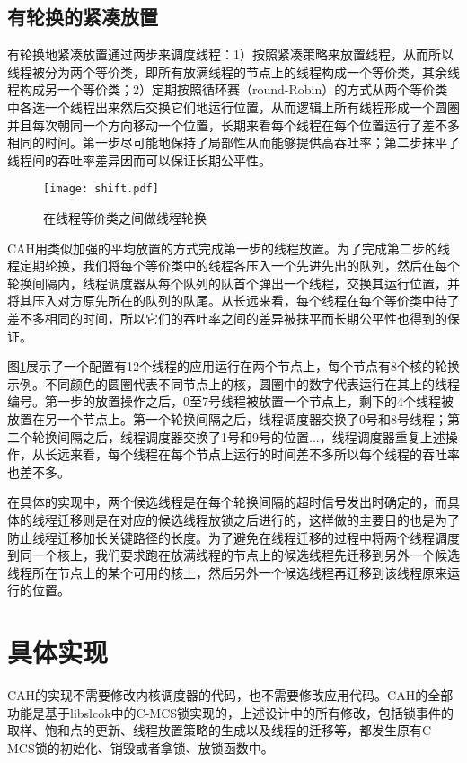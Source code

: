 \subsection{有轮换的紧凑放置}
有轮换地紧凑放置通过两步来调度线程：1）按照紧凑策略来放置线程，从而所以线程被分为两个等价类，即所有放满线程的节点上的线程构成一个等价类，其余线程构成另一个等价类；2）定期按照循环赛（round-Robin）的方式从两个等价类中各选一个线程出来然后交换它们地运行位置，从而逻辑上所有线程形成一个圆圈并且每次朝同一个方向移动一个位置，长期来看每个线程在每个位置运行了差不多相同的时间。第一步尽可能地保持了局部性从而能够提供高吞吐率；第二步抹平了线程间的吞吐率差异因而可以保证长期公平性。
\begin{figure}[t]
	\centering
	\texttt{[image: shift.pdf]}
	\caption{在线程等价类之间做线程轮换}
	\label{Fig:shift}
\end{figure}

CAH用类似加强的平均放置的方式完成第一步的线程放置。为了完成第二步的线程定期轮换，我们将每个等价类中的线程各压入一个先进先出的队列，然后在每个轮换间隔内，线程调度器从每个队列的队首个弹出一个线程，交换其运行位置，并将其压入对方原先所在的队列的队尾。从长远来看，每个线程在每个等价类中待了差不多相同的时间，所以它们的吞吐率之间的差异被抹平而长期公平性也得到的保证。

图\ref{Fig:shift}展示了一个配置有12个线程的应用运行在两个节点上，每个节点有8个核的轮换示例。不同颜色的圆圈代表不同节点上的核，圆圈中的数字代表运行在其上的线程编号。第一步的放置操作之后，0至7号线程被放置一个节点上，剩下的4个线程被放置在另一个节点上。第一个轮换间隔之后，线程调度器交换了0号和8号线程；第二个轮换间隔之后，线程调度器交换了1号和9号的位置...，线程调度器重复上述操作，从长远来看，每个线程在每个节点上运行的时间差不多所以每个线程的吞吐率也差不多。

在具体的实现中，两个候选线程是在每个轮换间隔的超时信号发出时确定的，而具体的线程迁移则是在对应的候选线程放锁之后进行的，这样做的主要目的也是为了防止线程迁移加长关键路径的长度。为了避免在线程迁移的过程中将两个线程调度到同一个核上，我们要求跑在放满线程的节点上的候选线程先迁移到另外一个候选线程所在节点上的某个可用的核上，然后另外一个候选线程再迁移到该线程原来运行的位置。

\section{具体实现}
CAH的实现不需要修改内核调度器的代码，也不需要修改应用代码。CAH的全部功能是基于libslcok\cite{kashyap2017scalable}中的C-MCS锁实现的，上述设计中的所有修改，包括锁事件的取样、饱和点的更新、线程放置策略的生成以及线程的迁移等，都发生原有C-MCS锁的初始化、销毁或者拿锁、放锁函数中。

